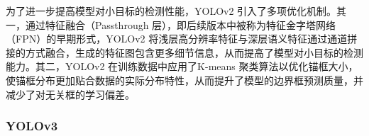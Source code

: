 \documentclass[11pt,twocolumn]{ctexart}
\begin{document}
为了进一步提高模型对小目标的检测性能，YOLOv2 引入了多项优化机制。其一，通过特征融合（Passthrough 层），即后续版本中被称为特征金字塔网络（FPN）的早期形式，YOLOv2 将浅层高分辨率特征与深层语义特征通过通道拼接的方式融合，生成的特征图包含更多细节信息，从而提高了模型对小目标的检测能力。其二，YOLOv2 在训练数据中应用了K-means 聚类算法以优化锚框大小，使锚框分布更加贴合数据的实际分布特性，从而提升了模型的边界框预测质量，并减少了对无关框的学习偏差。

\subsubsection{YOLOv3}
%
%
\end{document}
